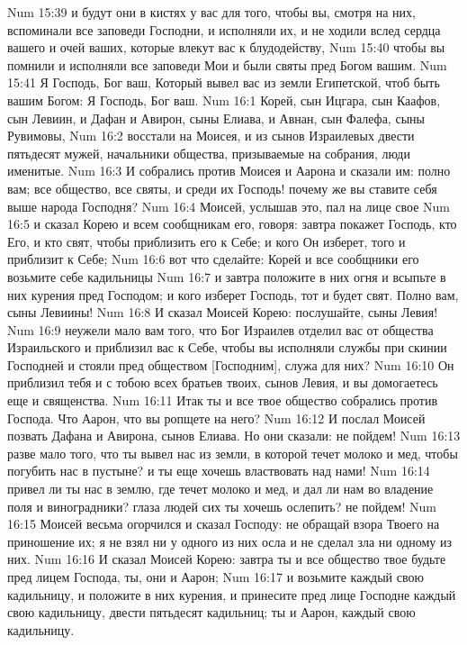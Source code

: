 \vs Num 15:39 и будут они в кистях у вас для того, чтобы вы, смотря на них, вспоминали все заповеди Господни, и исполняли их, и не ходили вслед сердца вашего и очей ваших, которые влекут вас к блудодейству,
\vs Num 15:40 чтобы вы помнили и исполняли все заповеди Мои и были святы пред Богом вашим.
\vs Num 15:41 Я Господь, Бог ваш, Который вывел вас из земли Египетской, чтоб быть вашим Богом: Я Господь, Бог ваш.
\vs Num 16:1 Корей, сын Ицгара, сын Каафов, сын Левиин, и Дафан и Авирон, сыны Елиава, и Авнан, сын Фалефа, сыны Рувимовы,
\vs Num 16:2 восстали на Моисея, и  из сынов Израилевых двести пятьдесят мужей, начальники общества, призываемые на собрания, люди именитые.
\vs Num 16:3 И собрались против Моисея и Аарона и сказали им: полно вам; все общество, все святы, и среди их Господь! почему же вы ставите себя выше народа Господня?
\vs Num 16:4 Моисей, услышав это, пал на лице свое
\vs Num 16:5 и сказал Корею и всем сообщникам его, говоря: завтра покажет Господь, кто Его, и кто свят, чтобы приблизить его к Себе; и кого Он изберет, того и приблизит к Себе;
\vs Num 16:6 вот что сделайте: Корей и все сообщники его возьмите себе кадильницы
\vs Num 16:7 и завтра положите в них огня и всыпьте в них курения пред Господом; и кого изберет Господь, тот и будет свят. Полно вам, сыны Левиины!
\vs Num 16:8 И сказал Моисей Корею: послушайте, сыны Левия!
\vs Num 16:9 неужели мало вам того, что Бог Израилев отделил вас от общества Израильского и приблизил вас к Себе, чтобы вы исполняли службы при скинии Господней и стояли пред обществом [Господним], служа для них?
\vs Num 16:10 Он приблизил тебя и с тобою всех братьев твоих, сынов Левия, и вы домогаетесь еще и священства.
\vs Num 16:11 Итак ты и все твое общество собрались против Господа. Что Аарон, что вы ропщете на него?
\vs Num 16:12 И послал Моисей позвать Дафана и Авирона, сынов Елиава. Но они сказали: не пойдем!
\vs Num 16:13 разве мало того, что ты вывел нас из земли, в которой течет молоко и мед, чтобы погубить нас в пустыне? и ты еще хочешь властвовать над нами!
\vs Num 16:14 привел ли ты нас в землю, где течет молоко и мед, и дал ли нам во владение поля и виноградники? глаза людей сих ты хочешь ослепить? не пойдем!
\vs Num 16:15 Моисей весьма огорчился и сказал Господу: не обращай взора Твоего на приношение их; я не взял ни у одного из них осла и не сделал зла ни одному из них.
\vs Num 16:16 И сказал Моисей Корею: завтра ты и все общество твое будьте пред лицем Господа, ты, они и Аарон;
\vs Num 16:17 и возьмите каждый свою кадильницу, и положите в них курения, и принесите пред лице Господне каждый свою кадильницу, двести пятьдесят кадильниц; ты и Аарон, каждый свою кадильницу.
